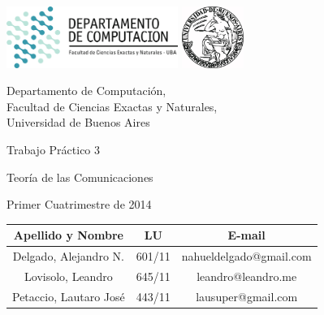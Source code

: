 \documentclass[a4paper, 10pt, twoside]{article}
\begin{document}


\thispagestyle{caratula}

\begin{center}

\includegraphics[height=2cm]{DC.png} 
\hfill
\includegraphics[height=2cm]{UBA.jpg} 

\vspace{2cm}

Departamento de Computación,\\
Facultad de Ciencias Exactas y Naturales,\\
Universidad de Buenos Aires

\vspace{4cm}

\begin{Huge}
Trabajo Práctico 3
\end{Huge}

\vspace{0.5cm}

\begin{Large}
Teoría de las Comunicaciones
\end{Large}

\vspace{1cm}

Primer Cuatrimestre de 2014

\vspace{4cm}

\begin{tabular}{|c|c|c|}
\hline
Apellido y Nombre & LU & E-mail\\
\hline
Delgado, Alejandro N.  & 601/11 & nahueldelgado@gmail.com\\
Lovisolo, Leandro      & 645/11 & leandro@leandro.me\\
Petaccio, Lautaro José & 443/11 & lausuper@gmail.com\\
\hline
\end{tabular}

\end{center}
\end{document}
